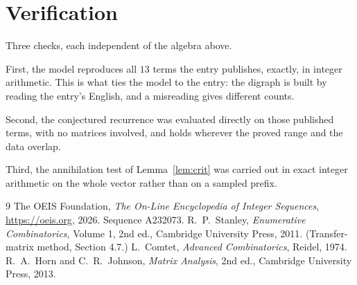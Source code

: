 \documentclass[11pt,a4paper]{article}
\theoremstyle{plain}
\theoremstyle{definition}
\begin{document}
\section{Verification}

Three checks, each independent of the algebra above.

First, the model reproduces all $13$ terms the entry publishes, exactly, in integer
arithmetic. This is what ties the model to the entry: the digraph is built by reading the
entry's English, and a misreading gives different counts.

Second, the conjectured recurrence was evaluated directly on those published terms, with no
matrices involved, and holds wherever the proved range and the data overlap.

Third, the annihilation test of Lemma~\ref{lem:crit} was carried out in exact integer
arithmetic on the whole vector rather than on a sampled prefix.

\begin{thebibliography}{9}
 The OEIS Foundation, \emph{The On-Line Encyclopedia of Integer
Sequences}, \url{https://oeis.org}, 2026. Sequence A232073.
 R.~P.~Stanley, \emph{Enumerative Combinatorics}, Volume 1, 2nd ed.,
Cambridge University Press, 2011. (Transfer-matrix method, Section 4.7.)
 L.~Comtet, \emph{Advanced Combinatorics}, Reidel, 1974.
 R.~A.~Horn and C.~R.~Johnson, \emph{Matrix Analysis}, 2nd ed., Cambridge
University Press, 2013.
\end{thebibliography}
\end{document}
